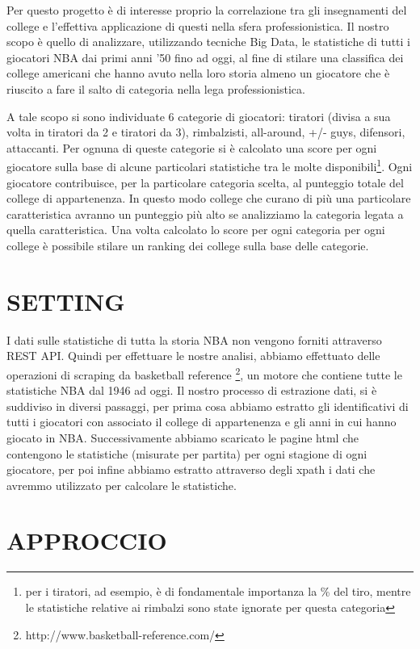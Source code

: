 \documentclass[10pt,a4paper,onecolumn]{article}
\begin{document}
Per questo progetto è di interesse proprio la correlazione tra gli insegnamenti del college e l'effettiva applicazione di questi nella sfera professionistica. Il nostro scopo è quello di analizzare, utilizzando tecniche Big Data, le statistiche di tutti i giocatori NBA dai primi anni '50 fino ad oggi, al fine di stilare una classifica dei college americani che hanno avuto nella loro storia almeno un giocatore che è riuscito a fare il salto di categoria nella lega professionistica.

A tale scopo si sono individuate 6 categorie di giocatori: tiratori (divisa a sua volta in tiratori da 2 e tiratori da 3), rimbalzisti, all-around, +/- guys, difensori, attaccanti. Per ognuna di queste categorie si è calcolato una score per ogni giocatore sulla base di alcune particolari statistiche tra le molte disponibili\footnote{per i tiratori, ad esempio, è di fondamentale importanza la \% del tiro, mentre le statistiche relative ai rimbalzi sono state ignorate per questa categoria}. Ogni giocatore contribuisce, per la particolare categoria scelta, al punteggio totale del college di appartenenza. In questo modo college che curano di più una particolare caratteristica avranno un punteggio più alto se analizziamo la categoria legata a quella caratteristica. Una volta calcolato lo score per ogni categoria per ogni college è possibile stilare un ranking dei college sulla base delle categorie.


\section{SETTING}

I dati sulle statistiche di tutta la storia NBA non vengono forniti attraverso REST API. Quindi per effettuare le nostre analisi, abbiamo effettuato delle operazioni di scraping da basketball reference \footnote{http://www.basketball-reference.com/}, un motore che contiene tutte le statistiche NBA dal 1946 ad oggi.
Il nostro processo di estrazione dati, si è suddiviso in diversi passaggi, per prima cosa abbiamo estratto gli identificativi di tutti i giocatori con associato il college di appartenenza e gli anni in cui hanno giocato in NBA. Successivamente abbiamo scaricato le pagine html che contengono le statistiche (misurate per partita) per ogni stagione di ogni giocatore, per poi infine abbiamo estratto attraverso degli xpath i dati che avremmo utilizzato per calcolare le statistiche.

\section{APPROCCIO}
\end{document}
